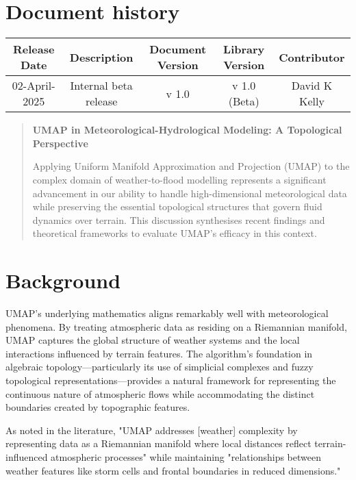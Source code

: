 \documentclass{article}
\begin{document}
\section{Document history}
\begin{table}[ht]
    \centering
    \begin{tabular}{c|c|c|c|c}
        Release Date & Description & Document Version & Library Version & Contributor\\
        \hline
        02-April-2025 & Internal beta release & v 1.0 & v 1.0 (Beta) & David K Kelly\\

    \end{tabular}
    \label{tab:revision_history}
\end{table}

\clearpage

\begin{abstract}
\textbf{UMAP in Meteorological-Hydrological Modeling: A Topological Perspective}

	Applying Uniform Manifold Approximation and Projection (UMAP) to the complex domain of weather-to-flood modelling represents a significant advancement in our ability to handle high-dimensional meteorological data while preserving the essential topological structures that govern fluid dynamics over terrain. This discussion synthesises recent findings and theoretical frameworks to evaluate UMAP's efficacy in this context.

\end{abstract}

\clearpage
\section{Background}

UMAP's underlying mathematics aligns remarkably well with meteorological phenomena. By treating atmospheric data as residing on a Riemannian manifold, UMAP captures the global structure of weather systems and the local interactions influenced by terrain features. The algorithm's foundation in algebraic topology—particularly its use of simplicial complexes and fuzzy topological representations—provides a natural framework for representing the continuous nature of atmospheric flows while accommodating the distinct boundaries created by topographic features.\par

As noted in the literature, "UMAP addresses [weather] complexity by representing data as a Riemannian manifold where local distances reflect terrain-influenced atmospheric processes" while maintaining "relationships between weather features like storm cells and frontal boundaries in reduced dimensions."\par
\end{document}
